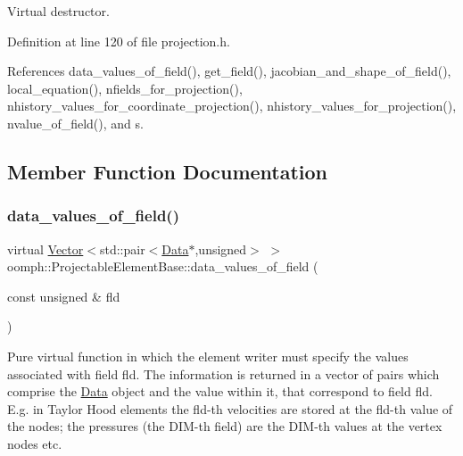 Virtual destructor. 



Definition at line 120 of file projection.\+h.



References data\+\_\+values\+\_\+of\+\_\+field(), get\+\_\+field(), jacobian\+\_\+and\+\_\+shape\+\_\+of\+\_\+field(), local\+\_\+equation(), nfields\+\_\+for\+\_\+projection(), nhistory\+\_\+values\+\_\+for\+\_\+coordinate\+\_\+projection(), nhistory\+\_\+values\+\_\+for\+\_\+projection(), nvalue\+\_\+of\+\_\+field(), and s.



\subsection{Member Function Documentation}
\mbox{\label{classoomph_1_1ProjectableElementBase_a644306ebdf16f334344c2d27d72f18b7}} 
\subsubsection{\texorpdfstring{data\+\_\+values\+\_\+of\+\_\+field()}{data\_values\_of\_field()}}
{\footnotesize\ttfamily virtual \hyperlink{classoomph_1_1Vector}{Vector}$<$std\+::pair$<$\hyperlink{classoomph_1_1Data}{Data}$\ast$,unsigned$>$ $>$ oomph\+::\+Projectable\+Element\+Base\+::data\+\_\+values\+\_\+of\+\_\+field (\begin{DoxyParamCaption}\item[{const unsigned \&}]{fld }\end{DoxyParamCaption})\hspace{0.3cm}{\ttfamily [pure virtual]}}



Pure virtual function in which the element writer must specify the values associated with field fld. The information is returned in a vector of pairs which comprise the \hyperlink{classoomph_1_1Data}{Data} object and the value within it, that correspond to field fld. E.\+g. in Taylor Hood elements the fld-\/th velocities are stored at the fld-\/th value of the nodes; the pressures (the D\+I\+M-\/th field) are the D\+I\+M-\/th values at the vertex nodes etc. 



